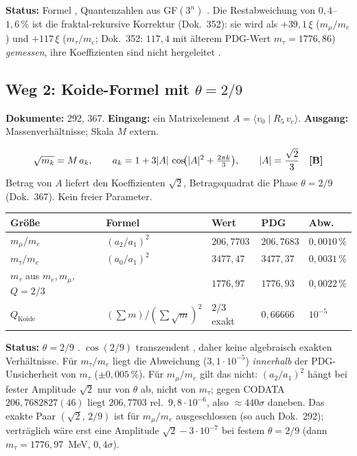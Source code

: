\textbf{Status:} Formel \BM, Quantenzahlen aus GF$(3^n)$ \KM. Die Restabweichung
von $0{,}4$--$1{,}6\,\%$ ist die fraktal-rekursive Korrektur (Dok.~352): sie wird als
$+39{,}1\,\xi$ ($m_\mu/m_e$) und $+117\,\xi$ ($m_\tau/m_e$; Dok.~352: $117{,}4$ mit älterem PDG-Wert $m_\tau=1776{,}86$) \emph{gemessen}, ihre
Koeffizienten sind nicht hergeleitet \SM.

\subsection{Weg 2: Koide-Formel mit $\theta = 2/9$}

\textbf{Dokumente:} 292, 367. \quad
\textbf{Eingang:} ein Matrixelement $A = \langle v_0\mid R_5\,v_e\rangle$. \quad
\textbf{Ausgang:} Massenverhältnisse; Skala $M$ extern.

\[
  \sqrt{m_k} = M\,a_k, \qquad
  a_k = 1 + 3|A|\,\cos\!\bigl(|A|^2 + \tfrac{2\pi k}{3}\bigr),
  \qquad |A| = \frac{\sqrt2}{3} \quad \textbf{[B]}
\]
Betrag von $A$ liefert den Koeffizienten $\sqrt2$, Betragsquadrat die Phase
$\theta = 2/9$ (Dok.~367). Kein freier Parameter.

\begin{center}
\begin{tabular}{@{}lllll@{}}
\toprule
Größe & Formel & Wert & PDG & Abw. \\
\midrule
$m_\mu/m_e$  & $(a_2/a_1)^2$ & $206{,}7703$ & $206{,}7683$ & $0{,}0010\,\%$ \\
$m_\tau/m_e$ & $(a_0/a_1)^2$ & $3477{,}47$  & $3477{,}37$  & $0{,}0031\,\%$ \\
$m_\tau$ aus $m_e,m_\mu$, $Q=2/3$ & & $1776{,}97$ & $1776{,}93$ & $0{,}0022\,\%$ \\
$Q_\text{Koide}$ & $(\sum m)/(\sum\sqrt m)^2$ & $2/3$ exakt & $0{,}66666$ & $10^{-5}$ \\
\bottomrule
\end{tabular}
\end{center}

\textbf{Status:} $\theta = 2/9$ \BM. $\cos(2/9)$ transzendent \EM, daher keine
algebraisch exakten Verhältnisse. Für $m_\tau/m_e$ liegt die Abweichung
($3{,}1\cdot10^{-5}$) \emph{innerhalb} der PDG-Unsicherheit von $m_\tau$
($\pm0{,}005\,\%$). Für $m_\mu/m_e$ gilt das nicht: $(a_2/a_1)^2$ hängt bei
fester Amplitude $\sqrt2$ nur von $\theta$ ab, nicht von $m_\tau$; gegen CODATA
$206{,}7682827(46)$ liegt $206{,}7703$ rel.\ $9{,}8\cdot10^{-6}$, also
${\approx}440\sigma$ daneben. Das exakte Paar $(\sqrt2,\,2/9)$ ist für
$m_\mu/m_e$ ausgeschlossen (so auch Dok.~292); verträglich wäre erst eine
Amplitude $\sqrt2 - 3\cdot10^{-7}$ bei festem $\theta=2/9$ (dann
$m_\tau = 1776{,}97$~MeV, $0{,}4\sigma$).

